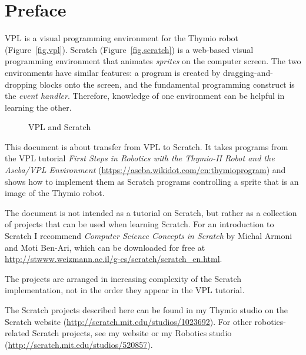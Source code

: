 \chapter*{Preface}


VPL is a visual programming environment for the Thymio robot
(Figure~\ref{fig.vpl}). Scratch (Figure~\ref{fig.scratch}) is a
web-based visual programming environment that animates \emph{sprites} on
the computer screen. The two environments have similar features: a
program is created by dragging-and-dropping blocks onto the screen, and
the fundamental programming construct is the \emph{event handler}.
Therefore, knowledge of one environment can be helpful in learning the
other.

\begin{figure}[hb]
\centering
	\hspace{1.5cm}
    \caption{VPL and Scratch}
    \label{fig.vplscratch}
\end{figure}

This document is about transfer from VPL to Scratch. It takes programs
from the VPL tutorial \emph{First Steps in Robotics with the Thymio-II
Robot and the Aseba/VPL Environment}
(\url{https://aseba.wikidot.com/en:thymioprogram}) and shows how to
implement them as Scratch programs controlling a sprite that is an
image of the Thymio robot.


The document is not intended as a tutorial on Scratch, but
rather as a collection of projects that can be used when learning
Scratch. For an introduction to Scratch I recommend \textit{Computer
Science Concepts in Scratch} by Michal Armoni and Moti Ben-Ari, which
can be downloaded for free at
\url{http://stwww.weizmann.ac.il/g-cs/scratch/scratch_en.html}.

The projects are arranged in increasing complexity of the Scratch
implementation, not in the order they appear in the VPL tutorial.

The Scratch projects described here can be found in my Thymio studio on
the Scratch website (\url{http://scratch.mit.edu/studios/1023692}). For
other robotics-related Scratch projects, see my website or my Robotics
studio (\url{http://scratch.mit.edu/studios/520857}).

